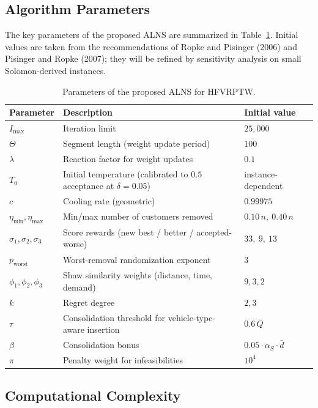 \documentclass[11pt]{article}
\begin{document}
\subsection{Algorithm Parameters}

The key parameters of the proposed ALNS are summarized in Table~\ref{tab:params}. Initial values are taken from the recommendations of Ropke and Pisinger (2006) and Pisinger and Ropke (2007); they will be refined by sensitivity analysis on small Solomon-derived instances.

\begin{table}[h]
\centering
\begin{tabular}{@{}lll@{}}
\toprule
\textbf{Parameter} & \textbf{Description} & \textbf{Initial value} \\
\midrule
$I_{\max}$ & Iteration limit & $25{,}000$ \\
$\Theta$ & Segment length (weight update period) & $100$ \\
$\lambda$ & Reaction factor for weight updates & $0.1$ \\
$T_0$ & Initial temperature (calibrated to $0.5$ acceptance at $\delta = 0.05$) & instance-dependent \\
$c$ & Cooling rate (geometric) & $0.99975$ \\
$\eta_{\min}, \eta_{\max}$ & Min/max number of customers removed & $0.10\,n,\ 0.40\,n$ \\
$\sigma_1, \sigma_2, \sigma_3$ & Score rewards (new best / better / accepted-worse) & $33,\ 9,\ 13$ \\
$p_{\mathrm{worst}}$ & Worst-removal randomization exponent & $3$ \\
$\phi_1, \phi_2, \phi_3$ & Shaw similarity weights (distance, time, demand) & $9, 3, 2$ \\
$k$ & Regret degree & $2, 3$ \\
$\tau$ & Consolidation threshold for vehicle-type-aware insertion & $0.6\,Q$ \\
$\beta$ & Consolidation bonus & $0.05 \cdot \alpha_S \cdot \bar{d}$ \\
$\pi$ & Penalty weight for infeasibilities & $10^4$ \\
\bottomrule
\end{tabular}
\caption{Parameters of the proposed ALNS for HFVRPTW.}
\label{tab:params}
\end{table}

\subsection{Computational Complexity}
\end{document}

